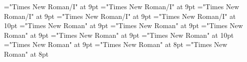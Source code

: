 \documentclass[gps1,twoside]{article}
\begin{document}
\font\translationspanexampleexampleexamplessensesensessensesensessubentrysubentriesentryexamplespansensespanspansubentrysubentriesentrysubentriesdiventryletData="Times New Roman/I" at 9pt
\font\translationafterspanexampleexampleexamplessensesensessensesensessubentrysubentriesentryexamplespansensespanspansubentrysubentriesentrysubentriesdiventryletData="Times New Roman/I" at 9pt
\font\translationtranslationspanexampleexampleexamplessensesensessensesensessubentrysubentriesentryexamplespansensespanspansubentrysubentriesentrysubentriesdiventryletData="Times New Roman/I" at 9pt
\font\translationaftertranslationspanexampleexampleexamplessensesensessensesensessubentrysubentriesentryexamplespansensespanspansubentrysubentriesentrysubentriesdiventryletData="Times New Roman/I" at 9pt
\font\spanentranslationtranslationspanexampleexampleexamplessensesensessensesensessubentrysubentriesentryexamplespansensespanspansubentrysubentriesentrysubentriesdiventryletData="Times New Roman/I" at 10pt
\font\semanticdomainssensesensessubentrysubentriesentrybeforesensespanspansubentrysubentriesentrysubentriesdiventryletData="Times New Roman" at 9pt
\font\semanticdomainssensesensessubentrysubentriesentryaftersensespanspansubentrysubentriesentrysubentriesdiventryletData="Times New Roman" at 9pt
\font\spanspansensespanspansubentrysubentriesentrysubentriesdiventryletData="Times New Roman" at 9pt
\font\spanspanspansensespanspansubentrysubentriesentrysubentriesdiventryletData="Times New Roman" at 9pt
\font\spanenspanspanspansensespanspansubentrysubentriesentrysubentriesdiventryletData="Times New Roman" at 10pt
\font\semanticdomainsemanticdomainsemanticdomainssensesensessensesensessubentrysubentriesentrybeforespansensespanspansubentrysubentriesentrysubentriesdiventryletData="Times New Roman" at 9pt
\font\exampleexampleexamplessensesensessensesensessubentrysubentriesentrybeforespansensespanspansubentrysubentriesentrysubentriesdiventryletData="Times New Roman" at 8pt
\font\exampleexampleexamplessensesensessensesensessubentrysubentriesentrybeforeexamplespansensespanspansubentrysubentriesentrysubentriesdiventryletData="Times New Roman" at 8pt
\end{document}
